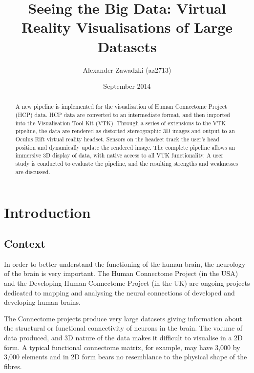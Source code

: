 \documentclass[MSc,paper=a4,pagesize=auto]{icldt}
\title{Seeing the Big Data: Virtual Reality Visualisations of Large Datasets}
\author{Alexander Zawadzki (az2713)}
\date{September 2014}
\begin{document}
\maketitle

\begin{abstract}
A new pipeline is implemented for the visualisation of Human Connectome Project (HCP) data. HCP data are converted to an intermediate format, and then imported into the Visualisation Tool Kit (VTK). Through a series of extensions to the VTK pipeline, the data are rendered as distorted stereographic 3D images and output to an Oculus Rift virtual reality headset. Sensors on the headset track the user's head position and dynamically update the rendered image. The complete pipeline allows an immersive 3D display of data, with native access to all VTK functionality. A user study is conducted to evaluate the pipeline, and the resulting strengths and weaknesses are discussed.


\end{abstract}

\makededication
\tableofcontents

\listoftables
\listoffigures


\chapter{Introduction}
\section{Context}
In order to better understand the functioning of the human brain, the neurology of the brain is very important. The Human Connectome Project (in the USA) and the Developing Human Connectome Project (in the UK) are ongoing projects dedicated to mapping and analysing the neural connections of developed and developing human brains. 

The Connectome projects produce very large datasets giving information about the structural or functional connectivity of neurons in the brain. The volume of data produced, and 3D nature of the data makes it difficult to visualise in a 2D form. A typical functional connectome matrix, for example, may have 3,000 by 3,000 elements and in 2D form bears no resemblance to the physical shape of the fibres.
\end{document}
